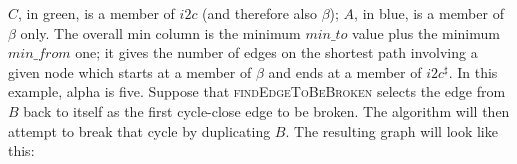 $C$, in green, is a member of $i2c$ (and therefore also $\beta$); $A$,
in blue, is a member of $\beta$ only.  The overall min column is the
minimum $\mathit{min\_to}$ value plus the minimum $\mathit{min\_from}$
one; it gives the number of edges on the shortest path involving a
given node which starts at a member of $\beta$ and ends at a member of
$i2c^\sharp$.  In this example, \gls{alpha} is five.  Suppose that
\textsc{findEdgeToBeBroken} selects the edge from $B$ back to itself
as the first cycle-close edge to be broken.  The algorithm will then
attempt to break that cycle by duplicating $B$.  The resulting graph
will look like this:

